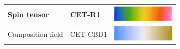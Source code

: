 \begin{center}
\begin{tabular}{lll}
\hline
Spin tensor & CET-R1 &  \includegraphics[width=3cm]{images/colourscales/CET-R1}\\
\hline
Composition field & CET-CBD1 &  \includegraphics[width=3cm]{images/colourscales/CET-CBD1}\\
\hline
\end{tabular}
\end{center}





